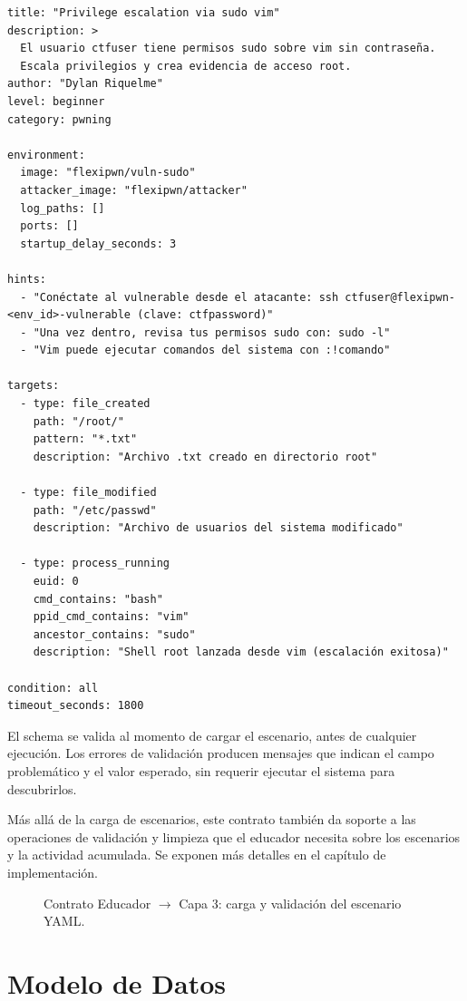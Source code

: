 \begin{verbatim}
title: "Privilege escalation via sudo vim"
description: >
  El usuario ctfuser tiene permisos sudo sobre vim sin contraseña.
  Escala privilegios y crea evidencia de acceso root.
author: "Dylan Riquelme"
level: beginner
category: pwning

environment:
  image: "flexipwn/vuln-sudo"
  attacker_image: "flexipwn/attacker"
  log_paths: []
  ports: []
  startup_delay_seconds: 3

hints:
  - "Conéctate al vulnerable desde el atacante: ssh ctfuser@flexipwn-<env_id>-vulnerable (clave: ctfpassword)"
  - "Una vez dentro, revisa tus permisos sudo con: sudo -l"
  - "Vim puede ejecutar comandos del sistema con :!comando"

targets:
  - type: file_created
    path: "/root/"
    pattern: "*.txt"
    description: "Archivo .txt creado en directorio root"

  - type: file_modified
    path: "/etc/passwd"
    description: "Archivo de usuarios del sistema modificado"

  - type: process_running
    euid: 0
    cmd_contains: "bash"
    ppid_cmd_contains: "vim"
    ancestor_contains: "sudo"
    description: "Shell root lanzada desde vim (escalación exitosa)"

condition: all
timeout_seconds: 1800
\end{verbatim}

El schema se valida al momento de cargar el escenario, antes de cualquier
ejecución. Los errores de validación producen mensajes que indican el campo
problemático y el valor esperado, sin requerir ejecutar el sistema para
descubrirlos.

Más allá de la carga de escenarios, este contrato también da soporte a las
operaciones de validación y limpieza que el educador necesita sobre los
escenarios y la actividad acumulada. Se exponen más detalles en el capítulo de
implementación.

\begin{figure}[h]
    \centering
    \resizebox{\textwidth}{!}{}
    \caption{Contrato Educador $\rightarrow$ Capa 3: carga y validación del
    escenario YAML.}
    \label{fig:contrato-ed3}
\end{figure}

\section{Modelo de Datos}

